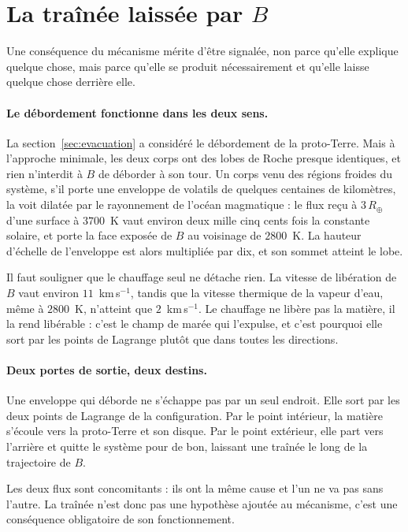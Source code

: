 \documentclass[11pt,a4paper,openany]{report}
\newcommand{\Rt}{R_{\oplus}}
\begin{document}
\section{La traînée laissée par \texorpdfstring{$B$}{B}}
\label{sec:trainee}

Une conséquence du mécanisme mérite d'être signalée, non parce qu'elle explique quelque chose, mais
parce qu'elle se produit nécessairement et qu'elle laisse quelque chose derrière elle.

\paragraph{Le débordement fonctionne dans les deux sens.} La section~\ref{sec:evacuation} a
considéré le débordement de la proto-Terre. Mais à l'approche minimale, les deux corps ont des lobes
de Roche presque identiques, et rien n'interdit à $B$ de déborder à son tour. Un corps venu des
régions froides du système, s'il porte une enveloppe de volatils de quelques centaines de
kilomètres, la voit dilatée par le rayonnement de l'océan magmatique : le flux reçu à $3\,\Rt$
d'une surface à $3700$~K vaut environ deux mille cinq cents fois la constante solaire, et porte la
face exposée de $B$ au voisinage de $2800$~K. La hauteur d'échelle de l'enveloppe est alors
multipliée par dix, et son sommet atteint le lobe.

Il faut souligner que le chauffage seul ne détache rien. La vitesse de libération de $B$ vaut
environ $11$~km\,s$^{-1}$, tandis que la vitesse thermique de la vapeur d'eau, même à $2800$~K,
n'atteint que $2$~km\,s$^{-1}$. Le chauffage ne libère pas la matière, il la rend libérable : c'est
le champ de marée qui l'expulse, et c'est pourquoi elle sort par les points de Lagrange plutôt que
dans toutes les directions.

\paragraph{Deux portes de sortie, deux destins.} Une enveloppe qui déborde ne s'échappe pas par un
seul endroit. Elle sort par les deux points de Lagrange de la configuration. Par le point intérieur,
la matière s'écoule vers la proto-Terre et son disque. Par le point extérieur, elle part vers
l'arrière et quitte le système pour de bon, laissant une traînée le long de la trajectoire de $B$.

Les deux flux sont concomitants : ils ont la même cause et l'un ne va pas sans l'autre. La traînée
n'est donc pas une hypothèse ajoutée au mécanisme, c'est une conséquence obligatoire de son
fonctionnement.
\end{document}
